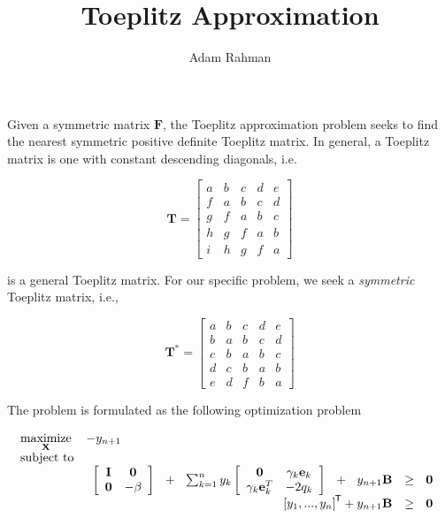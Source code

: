 \documentclass{article}
\author{Adam Rahman}
\title{Toeplitz Approximation}
\newcommand{\ve}[1]{\mathbf{#1}}           %
\newcommand{\m}[1]{\mathbf{#1}}               %
\newcommand{\tr}[1]{{#1}^{\mkern-1.5mu\mathsf{T}}}              %
\begin{document}
\maketitle

Given a symmetric matrix $\m{F}$, the Toeplitz approximation problem seeks to find the nearest symmetric positive definite Toeplitz matrix. In general, a Toeplitz matrix is one with constant descending diagonals, i.e.

\[
\m{T} = \left[
\begin{array}{ccccc}
a & b & c & d & e \\
f & a & b & c & d \\
g & f & a & b & c \\
h & g & f & a & b \\
i & h & g & f & a
\end{array}
\right]
\]

is a general Toeplitz matrix. For our specific problem, we seek a \emph{symmetric} Toeplitz matrix, i.e.,

\[
\m{T}^{\ast} = \left[
\begin{array}{ccccc}
a & b & c & d & e \\
b & a & b & c & d \\
c & b & a & b & c \\
d & c & b & a & b \\
e & d & f & b & a
\end{array}
\right]
\]

The problem is formulated as the following optimization problem 

\[
\begin{array}{ll}
\underset{\m{X}}{\text{maximize}} & -y_{n+1} \\
\text{subject to} & \\
&
\begin{array}{rl}
\left[\begin{array}{cc}
\m{I} & \m{0} \\
\m{0} & -\beta
\end{array}\right] ~~+~~ \sum_{k=1}^{n}y_{k}
\left[\begin{array}{cc}
\m{0} & \gamma_{k}\ve{e}_{k} \\
\gamma_{k}\ve{e}_{k}^{T} & -2q_{k}
\end{array}\right] ~~+~~y_{n+1}\m{B} &\geq~~ \m{0} \\
\tr{[y_{1},...,y_{n}]} + y_{n+1}\m{B} & \geq~~ \ve{0}
\end{array}
\end{array}
\]
\end{document}
